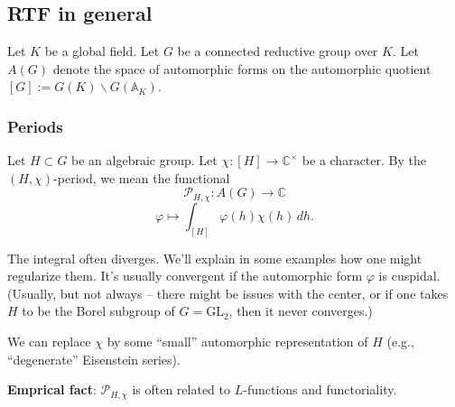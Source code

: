 \documentclass[reqno]{amsart} 
\numberwithin{theorem}{section}
\numberwithin{equation}{section}
\numberwithin{exercise}{section}
\begin{document}
\subsection{RTF in general}\label{sec:cq6tho1blx}

Let $K$ be a global field.  Let $G$ be a connected reductive group over $K$.  Let $A(G)$ denote the space of automorphic forms on the automorphic quotient $[G] := G(K) \backslash G(\mathbb{A}_K)$.

\subsubsection{Periods}\label{sec:cq6tho1auw}

Let $H \subset G$ be an algebraic group.  Let $\chi :[H] \rightarrow \mathbb{C}^\times$ be a character.  By the $(H, \chi)$-period, we mean the functional
\begin{equation*}
  \mathcal{P}_{H, \chi} : A(G) \rightarrow \mathbb{C}
\end{equation*}
\begin{equation*}
  \varphi \mapsto \int_{[H]} \varphi(h) \chi(h) \, d h.
\end{equation*}
\begin{remark}\label{remark:cq6tho091q}
  The integral often diverges.  We'll explain in some examples how one might regularize them.  It's usually convergent if the automorphic form $\varphi$ is cuspidal.  (Usually, but not always -- there might be issues with the center, or if one takes $H$ to be the Borel subgroup of $G = \mathrm{GL}_2$, then it never converges.)
\end{remark}

\begin{remark}\label{remark:cq6tho3lbh}
  We can replace $\chi$ by some ``small'' automorphic representation of $H$ (e.g., ``degenerate'' Eisenstein series).
\end{remark}

\textbf{Emprical fact}: $\mathcal{P}_{H, \chi}$ is often related to $L$-functions and functoriality.
\end{document}
